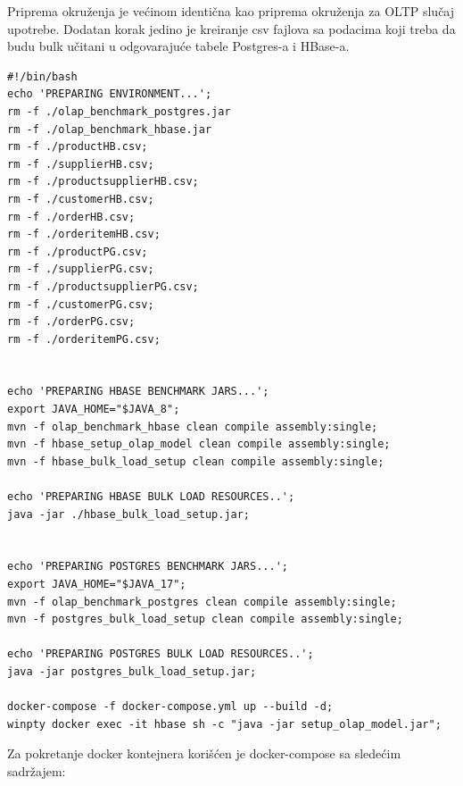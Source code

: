 \documentclass[12pt,oneside]{memoir}
\begin{document}
Priprema okruženja je većinom identična kao priprema okruženja za OLTP slučaj upotrebe. Dodatan korak jedino je kreiranje csv fajlova sa podacima koji treba da budu bulk učitani u odgovarajuće tabele Postgres-a i HBase-a.
\pagebreak
{}

\begin{lstlisting}[title={prepareEnv.sh},captionpos=t]
#!/bin/bash
echo 'PREPARING ENVIRONMENT...';
rm -f ./olap_benchmark_postgres.jar
rm -f ./olap_benchmark_hbase.jar
rm -f ./productHB.csv;
rm -f ./supplierHB.csv;
rm -f ./productsupplierHB.csv;
rm -f ./customerHB.csv;
rm -f ./orderHB.csv;
rm -f ./orderitemHB.csv;
rm -f ./productPG.csv;
rm -f ./supplierPG.csv;
rm -f ./productsupplierPG.csv;
rm -f ./customerPG.csv;
rm -f ./orderPG.csv;
rm -f ./orderitemPG.csv;


echo 'PREPARING HBASE BENCHMARK JARS...';
export JAVA_HOME="$JAVA_8";
mvn -f olap_benchmark_hbase clean compile assembly:single;
mvn -f hbase_setup_olap_model clean compile assembly:single;
mvn -f hbase_bulk_load_setup clean compile assembly:single;

echo 'PREPARING HBASE BULK LOAD RESOURCES..';
java -jar ./hbase_bulk_load_setup.jar;


echo 'PREPARING POSTGRES BENCHMARK JARS...';
export JAVA_HOME="$JAVA_17";
mvn -f olap_benchmark_postgres clean compile assembly:single;
mvn -f postgres_bulk_load_setup clean compile assembly:single;

echo 'PREPARING POSTGRES BULK LOAD RESOURCES..';
java -jar postgres_bulk_load_setup.jar;

docker-compose -f docker-compose.yml up --build -d;
winpty docker exec -it hbase sh -c "java -jar setup_olap_model.jar";

\end{lstlisting}


\pagebreak

 Za pokretanje docker kontejnera korišćen je docker-compose sa sledećim sadržajem:

\end{document}
